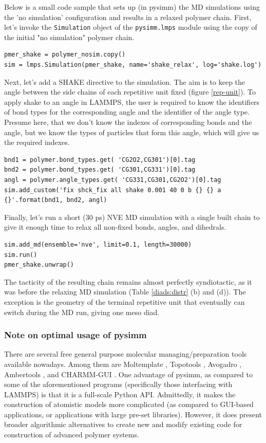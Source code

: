 \documentclass[9pt,tutorial]{livecoms}
\begin{document}
Below is a small code sample that sets up (in pysimm) the MD simulations using the 'no simulation' configuration and results in a relaxed polymer chain. First, let's invoke the \lstinline$Simulation$ object of the \lstinline$pysimm.lmps$ module using the copy of the initial "no simulation" polymer chain.
\begin{lstlisting}
pmer_shake = polymer_nosim.copy()
sim = lmps.Simulation(pmer_shake, name='shake_relax', log='shake.log')
\end{lstlisting}

Next, let's add a SHAKE directive to the simulation. The aim is to keep the angle between the side chains of each repetitive unit fixed (figure \ref{rep-unit}). To apply shake to an angle in LAMMPS, the user is required to know the identifiers of bond types for the corresponding angle and the identifier of the angle type. Presume here, that we don't know the indexes of corresponding bonds and the angle, but we know the types of particles that form this angle, which will give us the required indexes. 
\begin{lstlisting}
bnd1 = polymer.bond_types.get( 'CG2O2,CG301')[0].tag
bnd2 = polymer.bond_types.get( 'CG301,CG331')[0].tag
angl = polymer.angle_types.get( 'CG331,CG301,CG2O2')[0].tag
sim.add_custom('fix shck_fix all shake 0.001 40 0 b {} {} a {}'.format(bnd1, bnd2, angl)
\end{lstlisting}
Finally, let's run a short (30 ps) NVE MD simulation with a single built chain to give it enough time to relax all non-fixed bonds, angles, and dihedrals.
\begin{lstlisting}
sim.add_md(ensemble='nve', limit=0.1, length=30000)
sim.run()
pmer_shake.unwrap()
\end{lstlisting}

The tacticity of the resulting chain remains almost perfectly syndiotactic, as it was before the relaxing MD simulation (Table \ref{diads:distr} (b) and (d)). The exception is the geometry of the terminal repetitive unit that eventually can switch during the MD run, giving one meso diad.

\subsubsection{Note on optimal usage of pysimm}
There are several free general purpose molecular managing/preparation tools available nowadays. Among them are Moltemplate \cite{moltemplate}, Topotools \cite{topotools}, Avogadro \cite{avogadro}, Ambertools \cite{amber_2016}, and CHARMM-GUI \cite{Jo2008, charmm_gui_poly}. One advantage of pysimm, as compared to some of the aforementioned programs (specifically those interfacing with LAMMPS) is that it is a full-scale Python API. Admittedly, it makes the construction of atomistic models more complicated (as compared to GUI-based applications, or applications with large pre-set libraries).
However, it does present broader algorithmic alternatives to create new and modify existing code for construction of advanced polymer systems.
\end{document}
